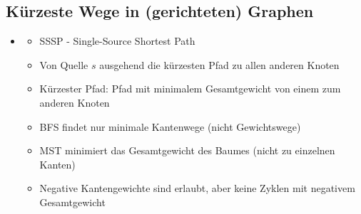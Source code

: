 \documentclass[
    12pt,
    a4paper,
    ngerman,
    color=3b,%
    marginpar=false,
    colorback=false,
    leqno,
]{tudaexercise}
\begin{document}
\subsection{Kürzeste Wege in (gerichteten) Graphen}
    \begin{itemize}
        \item {}
            \begin{itemize}
                \item SSSP - Single-Source Shortest Path
                \item Von Quelle $s$ ausgehend die kürzesten Pfad zu allen anderen Knoten
                \item Kürzester Pfad: Pfad mit minimalem Gesamtgewicht von einem zum anderen Knoten
                \item BFS findet nur minimale Kantenwege (nicht Gewichtswege)
                \item MST minimiert das Gesamtgewicht des Baumes (nicht zu einzelnen Kanten)
                \item Negative Kantengewichte sind erlaubt, aber keine Zyklen mit negativem Gesamtgewicht
            \end{itemize}
        

\end{itemize}
\end{document}
